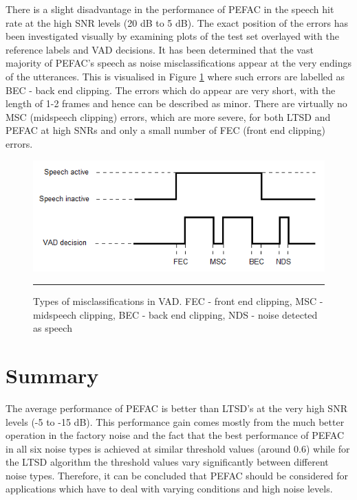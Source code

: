 There is a slight disadvantage in the performance of PEFAC in the speech hit rate at the high SNR levels (20 dB to 5 dB). The exact position of the errors has been investigated visually by examining plots of the test set overlayed with the reference labels and VAD decisions. It has been determined that the vast majority of PEFAC's speech as noise misclassifications appear at the very endings of the utterances. This is visualised in Figure \ref{fig:clipping} where such errors are labelled as BEC - back end clipping. The errors which do appear are very short, with the length of 1-2 frames and hence can be described as minor. There are virtually no MSC (midspeech clipping) errors, which are more severe, for both LTSD and PEFAC at high SNRs and only a small number of FEC (front end clipping) errors.

\begin{figure}[htbp]
	\centering
		\includegraphics[width=0.7\columnwidth]{Figures/Chapter5/clipping.png}
		\rule{37em}{0.5pt}
	\caption[Types of misclassifications in VAD]{Types of misclassifications in VAD. FEC - front end clipping, MSC - midspeech clipping, BEC - back end clipping, NDS - noise detected as speech}
	\label{fig:clipping}
\end{figure}


\section{Summary}

The average performance of PEFAC is better than LTSD's at the very high SNR levels (-5 to -15 dB). This performance gain comes mostly from the much better operation in the factory noise and the fact that the best performance of PEFAC in all six noise types is achieved at similar threshold values (around 0.6) while for the LTSD algorithm the threshold values vary significantly between different noise types. Therefore, it can be concluded that PEFAC should be considered for applications which have to deal with varying conditions and high noise levels.

